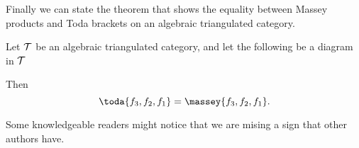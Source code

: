 Finally we can state the theorem that shows the equality between Massey products and Toda brackets on an algebraic triangulated category.

\begin{theorem}[Massey products = Toda brackets]
    \label{theorem:massey_equals_toda}
    Let \( {\mathcal{T}} \) be an algebraic triangulated category, and let the following be a diagram in \( {\mathcal{T}} \)
    \begin{center}
    \end{center}

    Then
    \[
        \toda{f_3, f_2, f_1} = \massey{f_3, f_2, f_1}.
    \]
\end{theorem}

Some knowledgeable readers might notice that we are mising a sign that other authors have.

